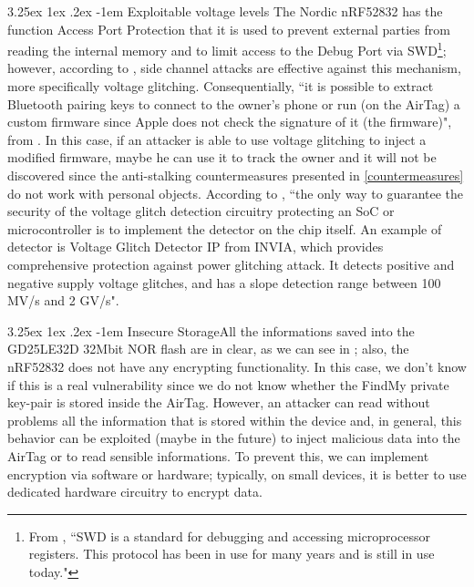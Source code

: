 \documentclass[english]{article}
\makeatletter
\renewcommand\paragraph{\@startsection{paragraph}{5}{\z@}%
  {3.25ex \@plus1ex \@minus.2ex}%
  {-1em}%
  {\normalfont\normalsize\bfseries}}
\makeatother
\begin{document}
\paragraph{Exploitable voltage levels}
The Nordic nRF52832 has the function Access Port Protection \cite{nordicsemi} that it is used to prevent external parties from reading the internal memory and to limit access to the Debug Port via SWD\footnote{From \cite{Oberli_2019}, ``SWD is a standard for debugging and accessing microprocessor registers. This protocol has been in use for many years and is still in use today."}; however, according to \cite{side}, side channel attacks are effective against this mechanism, more specifically voltage glitching. Consequentially, ``it is possible to extract Bluetooth pairing keys to connect to the owner’s phone or run (on the AirTag) a custom firmware since Apple does not check the signature of it (the firmware)", from \cite{reverse}. In this case, if an attacker is able to use voltage glitching to inject a modified firmware, maybe he can use it to track the owner and it will not be discovered since the anti-stalking countermeasures presented in \ref{countermeasures} do not work with personal objects. According to \cite{voltage}, ``the only way to guarantee the security of the voltage glitch detection circuitry protecting an SoC or microcontroller is to implement the detector on the chip itself. An example of detector is Voltage Glitch Detector IP from INVIA, which provides comprehensive protection against power glitching attack. It detects positive and negative supply voltage glitches, and has a slope detection range between 100 MV/s and 2 GV/s".

\paragraph{Insecure Storage}All the informations saved into the GD25LE32D 32Mbit NOR flash are in clear, as we can see in \cite{tweet}; also, the nRF52832 does not have any encrypting functionality. In this case, we don't know if this is a real vulnerability since we do not know whether the FindMy private key-pair is stored inside the AirTag. However, an attacker can read without problems all the information that is stored within the device and, in general, this behavior can be exploited (maybe in the future) to inject malicious data into the AirTag or to read sensible informations. To prevent this, we can implement encryption via software or hardware; typically, on small devices, it is better to use dedicated hardware circuitry to encrypt data.
\end{document}
